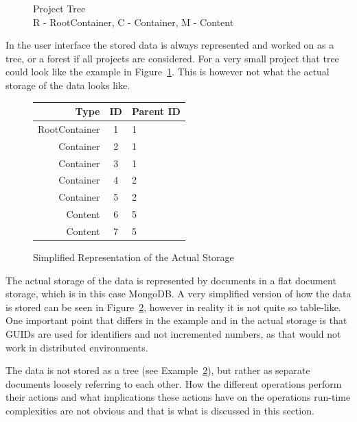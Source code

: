 \documentclass[a4paper,12pt]{article}
\begin{document}
\begin{figure}[H] 
    \caption{Project Tree\\R - RootContainer, C - Container, M - Content}
    \label{fig:project_tree}
\end{figure}

In the user interface the stored data is always represented and worked on as a tree, or a forest if
all projects are considered. For a very small project that tree could look like the example in
Figure~\ref{fig:project_tree}. This is however not what the actual storage of the data looks like.

\begin{figure}[H] 
    \centering
    \renewcommand{\arraystretch}{1.3}
    \begin{tabular}{|r|c|l|}
        \hline
        \textbf{Type} & \textbf{ID} & \textbf{Parent ID} \\
        \hline
        RootContainer & 1 & 1 \\
        Container     & 2 & 1 \\
        Container     & 3 & 1 \\
        Container     & 4 & 2 \\
        Container     & 5 & 2 \\
        Content       & 6 & 5 \\
        Content       & 7 & 5 \\
        \hline
    \end{tabular}
    \renewcommand{\arraystretch}{1.0}
    \caption{Simplified Representation of the Actual Storage}
    \label{fig:storage}
\end{figure}

The actual storage of the data is represented by documents in a flat document storage, which is in
this case MongoDB. A very simplified version of how the data is stored can be seen in
Figure~\ref{fig:storage}, however in reality it is not quite so table-like. One important point that
differs in the example and in the actual storage is that GUIDs are used for identifiers and not
incremented numbers, as that would not work in distributed environments. 

The data is not stored as a tree (see Example~\ref{fig:storage}), but rather as separate documents 
loosely referring to each other. How the different operations perform their actions and what 
implications these actions have on the operations run-time complexities are not obvious and that 
is what is discussed in this section.\\
\end{document}
